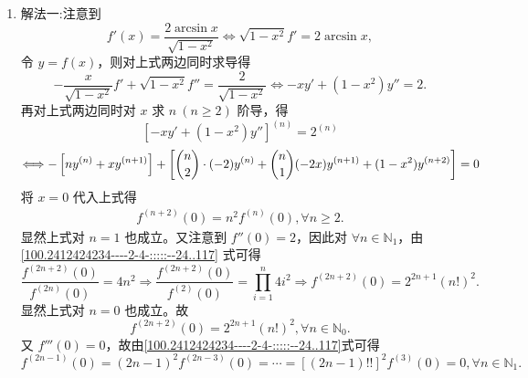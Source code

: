 \documentclass[../../main.tex]{subfiles}
\begin{document}
\begin{solution}
\begin{enumerate}[(1)]
\item {\color{blue}解法一:}注意到
\[
f'(x) = \frac{2\arcsin x}{\sqrt{1 - x^2}} \Longleftrightarrow \sqrt{1 - x^2} f' = 2\arcsin x,
\]
令 \( y = f(x) \)，则对上式两边同时求导得
\[
-\frac{x}{\sqrt{1 - x^2}} f' + \sqrt{1 - x^2} f'' = \frac{2}{\sqrt{1 - x^2}} \Longleftrightarrow -x y' + (1 - x^2) y'' = 2.
\]
再对上式两边同时对 \( x \) 求 \( n \ (n \geqslant 2) \) 阶导，得
\[
\left[ -x y' + (1 - x^2) y'' \right]^{(n)} = 2^{(n)}
\]
\[
\Longleftrightarrow -\left[ n y^{(n)} + x y^{(n + 1)} \right] + \left[ \dbinom{n}{2} \cdot (-2) y^{(n)} + \dbinom{n}{1} (-2x) y^{(n + 1)} + (1 - x^2) y^{(n + 2)} \right] = 0
\]
将 \( x = 0 \) 代入上式得
\begin{align}\label{100.2412424234----2-4-:::::--24..117}
f^{(n + 2)}(0) = n^2 f^{(n)}(0), \forall n \geqslant 2. 
\end{align}
显然上式对 \( n = 1 \) 也成立。又注意到 \( f''(0) = 2 \)，因此对 \( \forall n \in \mathbb{N}_1 \)，由\eqref{100.2412424234----2-4-:::::--24..117} 式可得
\[
\frac{f^{(2n + 2)}(0)}{f^{(2n)}(0)} = 4n^2 \Rightarrow \frac{f^{(2n + 2)}(0)}{f^{(2)}(0)} = \prod_{i = 1}^n 4i^2 \Rightarrow f^{(2n + 2)}(0) = 2^{2n + 1} (n!)^2.
\]
显然上式对 \( n = 0 \) 也成立。故
\[
f^{(2n + 2)}(0) = 2^{2n + 1} (n!)^2, \forall n \in \mathbb{N}_0.
\]
又 \( f'''(0) = 0 \)，故由\eqref{100.2412424234----2-4-:::::--24..117}式可得
\[
f^{(2n - 1)}(0) = (2n - 1)^2 f^{(2n - 3)}(0) = \cdots = \left[ (2n - 1)!! \right]^2 f^{(3)}(0) = 0, \forall n \in \mathbb{N}_1.
\]


\end{enumerate}
\end{solution}
\end{document}
